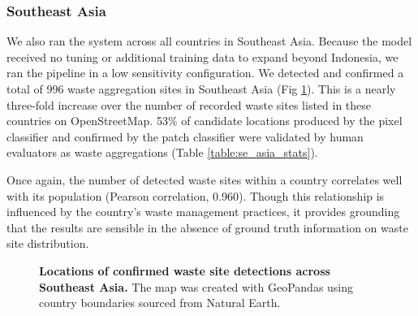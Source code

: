 \documentclass[10pt,letterpaper]{article}
\begin{document}
\subsubsection*{Southeast Asia}
We also ran the system across all countries in Southeast Asia. Because the model received no tuning or additional training data to expand beyond Indonesia, we ran the pipeline in a low sensitivity configuration. We detected and confirmed a total of 996 waste aggregation sites in Southeast Asia (Fig \ref{fig:se_asia_locations}). This is a nearly three-fold increase over the number of recorded waste sites listed in these countries on OpenStreetMap. 53\% of candidate locations produced by the pixel classifier and confirmed by the patch classifier were validated by human evaluators as waste aggregations (Table \ref{table:se_asia_stats}).

Once again, the number of detected waste sites within a country correlates well with its population (Pearson correlation, 0.960). Though this relationship is influenced by the country's waste management practices, it provides grounding that the results are sensible in the absence of ground truth information on waste site distribution.

\begin{figure}[!h]
    \caption{{\bf Locations of confirmed waste site detections across Southeast Asia.}
    The map was created with GeoPandas \cite{kelsey_jordahl_2020_3946761} using country boundaries sourced from Natural Earth.}
    \label{fig:se_asia_locations}
\end{figure}
\end{document}
